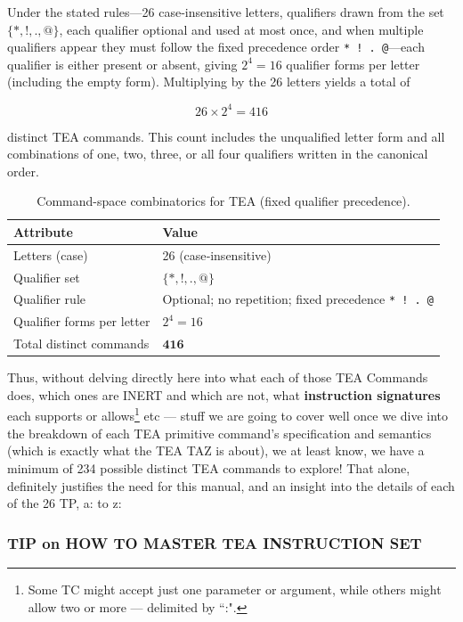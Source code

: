 \documentclass[a4paper, 18pt]{book} %
\begin{document}
\noindent Under the stated rules—26 case‑insensitive letters, qualifiers drawn from the set
$\{*,!,.,@\}$, each qualifier optional and used at most once, and when multiple qualifiers
appear they must follow the fixed precedence order \texttt{* ! . @}—each qualifier is either
present or absent, giving $2^{4}=16$ qualifier forms per letter (including the empty form).
Multiplying by the 26 letters yields a total of


\[
26 \times 2^{4} = 416
\]


distinct TEA commands. This count includes the unqualified letter form and all combinations
of one, two, three, or all four qualifiers written in the canonical order.

\begin{table}[ht]
  \centering
  \caption{Command-space combinatorics for TEA (fixed qualifier precedence).}
  \label{tab:tea-command-space}
  \begin{tabular}{@{}ll@{}}
    \hline
    \textbf{Attribute} & \textbf{Value} \\
    \hline
    Letters (case) & 26 (case‑insensitive) \\
    Qualifier set & \(\{*,!,.,@\}\) \\
    Qualifier rule & Optional; no repetition; fixed precedence \texttt{* ! . @} \\
    Qualifier forms per letter & \(2^{4}=16\) \\
    Total distinct commands & \(\mathbf{416}\) \\
    \hline
  \end{tabular}
\end{table}




Thus, without delving directly here into what each of those TEA Commands does, which ones are INERT and which are not, what \textbf{instruction signatures} each supports or allows\footnote{Some TC might accept just one parameter or argument, while others might allow two or more --- delimited by ``:".} etc --- stuff we are going to cover well once we dive into the breakdown of each TEA primitive command's specification and semantics (which is exactly what the TEA TAZ is about), we at least know, we have a minimum of 234 possible distinct TEA commands to explore! That alone, definitely justifies the need for this manual, and an insight into the details of each of the 26 TP, a: to z:


\subsubsection{TIP on HOW TO MASTER TEA INSTRUCTION SET}
\end{document}
